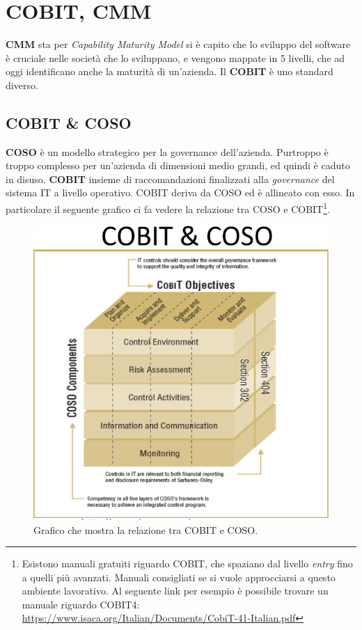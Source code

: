 \chapter{COBIT, CMM}

\textbf{CMM} sta per \textit{Capability Maturity Model} si è capito che lo 
sviluppo del software è cruciale nelle società che lo sviluppano, e vengono 
mappate in 5 livelli, che ad oggi identificano anche la maturità di un'azienda. 
Il \textbf{COBIT} è uno standard diverso.

\section{COBIT \& COSO}

\textbf{COSO} è un modello strategico per la governance dell'azienda. Purtroppo 
è troppo complesso per un'azienda di dimensioni medio grandi, ed quindi è caduto 
in disuso.
\textbf{COBIT} insieme di raccomandazioni finalizzati alla \textit{governance} 
del sistema IT a livello operativo.
COBIT deriva da COSO ed è allineato con esso. In particolare il seguente grafico 
ci fa vedere la relazione tra COSO e COBIT\footnote{Esistono manuali gratuiti 
riguardo COBIT, che spaziano dal livello \textit{entry} fino a quelli più 
avanzati. Manuali consigliati se si vuole approcciarsi a questo ambiente 
lavorativo. Al seguente link per esempio è possibile trovare un manuale riguardo 
COBIT4:  \url{https://www.isaca.org/Italian/Documents/CobiT-41-Italian.pdf}}.
\begin{figure}[h!]
        \begin{center}
                \includegraphics[scale=2.1]{res/img/cobit_coso_cube}
        \end{center}
        \caption{Grafico che mostra la relazione tra COBIT e COSO.}
\end{figure}

